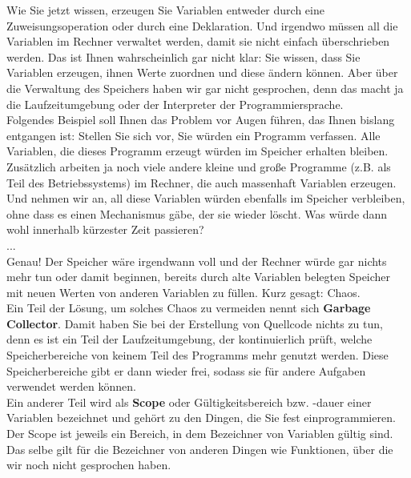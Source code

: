 Wie Sie jetzt wissen, erzeugen Sie Variablen entweder durch eine Zuweisungsoperation oder durch eine Deklaration. Und irgendwo müssen all die Variablen im Rechner verwaltet werden, damit sie nicht einfach überschrieben werden. Das ist Ihnen wahrscheinlich gar nicht klar: Sie wissen, dass Sie Variablen erzeugen, ihnen Werte zuordnen und diese ändern können. Aber über die Verwaltung des Speichers haben wir gar nicht gesprochen, denn das macht ja die Laufzeitumgebung oder der Interpreter der Programmiersprache.\\

Folgendes Beispiel soll Ihnen das Problem vor Augen führen, das Ihnen bislang entgangen ist: Stellen Sie sich vor, Sie würden ein Programm verfassen. Alle Variablen, die dieses Programm erzeugt würden im Speicher erhalten bleiben. Zusätzlich arbeiten ja noch viele andere kleine und große Programme (z.B. als Teil des Betriebssystems) im Rechner, die auch massenhaft Variablen erzeugen. Und nehmen wir an, all diese Variablen würden ebenfalls im Speicher verbleiben, ohne dass es einen Mechanismus gäbe, der sie wieder \glqq{}löscht\grqq{}. Was würde dann wohl innerhalb kürzester Zeit passieren?\\

...\\

Genau! Der Speicher wäre irgendwann voll und der Rechner würde gar nichts mehr tun oder damit beginnen, bereits durch alte Variablen belegten Speicher mit neuen Werten von anderen Variablen zu füllen. Kurz gesagt: Chaos.\\

Ein Teil der Lösung, um solches Chaos zu vermeiden nennt sich \textbf{Garbage Collector}. Damit haben Sie bei der Erstellung von Quellcode nichts zu tun, denn es ist ein Teil der Laufzeitumgebung, der kontinuierlich prüft, welche Speicherbereiche von keinem Teil des Programms mehr genutzt werden. 
Diese Speicherbereiche gibt er dann wieder frei, sodass sie für andere Aufgaben verwendet werden können.\\

Ein anderer Teil wird als \textbf{Scope} oder Gültigkeitsbereich bzw. -dauer einer Variablen bezeichnet und gehört zu den Dingen, die Sie fest einprogrammieren. Der Scope ist jeweils ein Bereich, in dem Bezeichner von Variablen gültig sind. Das selbe gilt für die Bezeichner von anderen Dingen wie Funktionen, über die wir noch nicht gesprochen haben.\\

